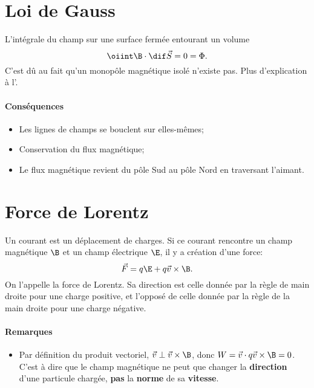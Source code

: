 
\section{Loi de Gauss}
L'intégrale du champ sur une surface fermée entourant un volume
\[ \oiint \B \cdot \dif \vec S = 0 = \Phi. \]
C'est dû au fait qu'un monopôle magnétique isolé n'existe pas.
Plus d'explication à l'.
\paragraph{Conséquences}
\begin{itemize}
  \item Les lignes de champs se bouclent sur elles-mêmes;
  \item Conservation du flux magnétique;
  \item Le flux magnétique revient du pôle Sud
    au pôle Nord en traversant l'aimant.
\end{itemize}

\section{Force de Lorentz}
\label{sec:lorentz}
Un courant est un déplacement de charges.
Si ce courant rencontre un champ magnétique $\B$ et un champ électrique $\E$,
il y a création d'une force:
\[ \vec F = q \E + q \vec v \times \B. \]
On l'appelle la force de Lorentz. Sa direction est celle donnée par la règle de
main droite pour une charge positive, et l'opposé de celle donnée par la règle
de la main droite pour une charge négative.

\paragraph{Remarques}
\begin{itemize}
  \item Par définition du produit vectoriel, $\vec v \perp \vec v \times \B$,
    donc $W = \vec v \cdot q\vec v \times \B = 0$.
    C'est à dire que le champ magnétique ne peut que changer
    la \textbf{direction} d'une particule chargée,
    \textbf{pas} la \textbf{norme} de sa \textbf{vitesse}.
\end{itemize}

